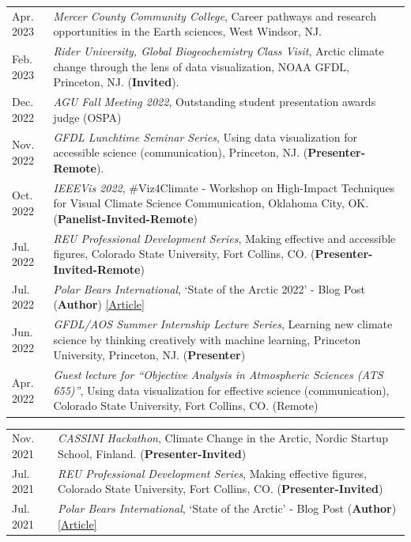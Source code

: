 \documentclass[margin,line,palatino,courier,10pt]{res}
\begin{document}
\begin{resume}
\begin{tabular}{@{}p{0.9in}p{4in}}
Apr. 2023 & \textit{Mercer County Community College}, Career pathways and research opportunities in the Earth sciences, West Windsor, NJ.\\
Feb. 2023 & \textit{Rider University, Global Biogeochemistry Class Visit}, Arctic climate change through the lens of data visualization, NOAA GFDL, Princeton, NJ. (\textbf{Invited}).\\
Dec. 2022 & \textit{AGU Fall Meeting 2022}, Outstanding student presentation awards judge (OSPA)\\
Nov. 2022 & \textit{GFDL Lunchtime Seminar Series}, Using data visualization for accessible science (communication), Princeton, NJ. (\textbf{Presenter-Remote}).\\
Oct. 2022 & \textit{IEEEVis 2022}, \#Viz4Climate - Workshop on High-Impact Techniques for Visual Climate Science Communication, Oklahoma City, OK. (\textbf{Panelist-Invited-Remote})\\
Jul. 2022 & \textit{REU Professional Development Series}, Making effective and accessible figures, Colorado State University, Fort Collins, CO. (\textbf{Presenter-Invited-Remote})\\
Jul. 2022 & \textit{Polar Bears International}, `State of the Arctic 2022' - Blog Post (\textbf{Author}) \href{https://polarbearsinternational.org/news-media/articles/arctic-sea-ice-conditions-2022}{[Article]}\\
Jun. 2022 & \textit{GFDL/AOS Summer Internship Lecture Series}, Learning new climate science by thinking creatively with machine learning, Princeton University, Princeton, NJ. (\textbf{Presenter})\\
Apr. 2022 & \textit{Guest lecture for ``Objective Analysis in Atmospheric Sciences (ATS 655)''}, Using data visualization for effective science (communication), Colorado State University, Fort Collins, CO. (Remote)\\
\end{tabular}
\begin{tabular}{@{}p{0.9in}p{4in}}
Nov. 2021 & \textit{CASSINI Hackathon}, Climate Change in the Arctic, Nordic Startup School, Finland. (\textbf{Presenter-Invited})\\
Jul. 2021 & \textit{REU Professional Development Series}, Making effective figures, Colorado State University, Fort Collins, CO. (\textbf{Presenter-Invited})\\
Jul. 2021 & \textit{Polar Bears International}, `State of the Arctic' - Blog Post (\textbf{Author}) \href{https://polarbearsinternational.org/news/article-climate-change/state-of-the-arctic/}{[Article]}\\

\end{tabular}
\end{resume}
\end{document}
